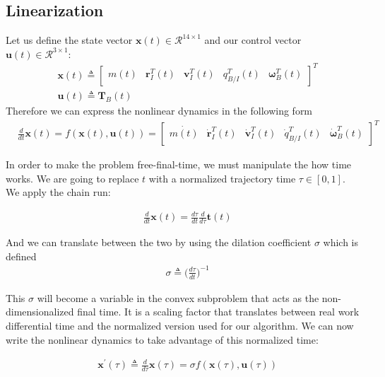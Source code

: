 \documentclass[conf]{new-aiaa}
\begin{document}
\begin{singlespace}
\subsection{Linearization}
Let us define the state vector $\mathbf{x}(t) \in \mathcal{R}^{14\times 1}$ and our control vector $\mathbf{u}(t) \in \mathcal{R}^{3\times 1}$:
\begin{align}
& \mathbf{x}(t) \triangleq 
	\begin{bmatrix}
	m(t) & \mathbf{r}_I^T(t) & \mathbf{v}_I^T(t) & q_{B/I}^T(t) & \bm{\omega}_B^T(t)   
	\end{bmatrix}^T \\
& \mathbf{u}(t) \triangleq \mathbf{T}_B(t)  
\end{align}
Therefore we can express the nonlinear dynamics in the following form
\begin{align}
& \frac{d}{dt}\mathbf{x}(t) = f(\mathbf{x}(t), \mathbf{u}(t)) =  
	\begin{bmatrix}
	\dot{m(t)} & \dot{\mathbf{r}}_I^T(t) & \dot{\mathbf{v}}_I^T(t) & \dot{q}_{B/I}^T(t) & \dot{\bm{\omega}}_B^T(t)  
	\end{bmatrix}^T
\end{align}

In order to make the problem free-final-time, we must manipulate the how time works. We are going to replace $t$ with a normalized trajectory time $\tau \in \left[0,1\right]$. We apply the chain run:


\begin{align}
& \frac{d}{dt}\mathbf{x}(t) = \frac{d\tau}{dt} \frac{d}{d\tau}\mathbf{t}(t)
\end{align}

And we can translate between the two by using the dilation coefficient $\sigma$ which is defined
\begin{align}
& \sigma \triangleq \Big(\frac{d\tau}{dt}\Big)^{-1}
\end{align}

This $\sigma$ will become a variable in the convex subproblem that acts as the non-dimensionalized final time. It is a scaling factor that translates between real work differential time and the normalized version used for our algorithm. We can now write the nonlinear dynamics to take advantage of this normalized time:

\begin{align}
& \mathbf{x}^\prime(\tau) \triangleq \frac{d}{d\tau}\mathbf{x}(\tau) = \sigma f(\mathbf{x}(\tau), \mathbf{u}(\tau))
\end{align}


\end{singlespace}
\end{document}
